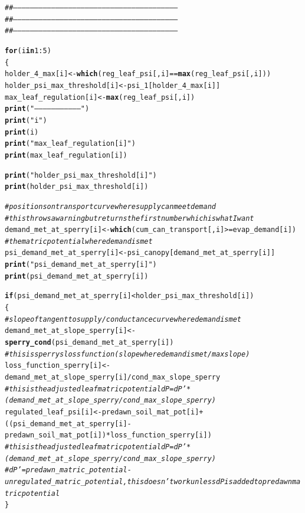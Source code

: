 \documentclass[a4paper]{article}\usepackage[]{graphicx}\usepackage[]{color}
\makeatletter
\newcommand{\hlnum}[1]{\textcolor[rgb]{0.686,0.059,0.569}{#1}}%
\newcommand{\hlstr}[1]{\textcolor[rgb]{0.192,0.494,0.8}{#1}}%
\newcommand{\hlcom}[1]{\textcolor[rgb]{0.678,0.584,0.686}{\textit{#1}}}%
\newcommand{\hlopt}[1]{\textcolor[rgb]{0,0,0}{#1}}%
\newcommand{\hlstd}[1]{\textcolor[rgb]{0.345,0.345,0.345}{#1}}%
\newcommand{\hlkwa}[1]{\textcolor[rgb]{0.161,0.373,0.58}{\textbf{#1}}}%
\newcommand{\hlkwb}[1]{\textcolor[rgb]{0.69,0.353,0.396}{#1}}%
\newcommand{\hlkwd}[1]{\textcolor[rgb]{0.737,0.353,0.396}{\textbf{#1}}}%
\newenvironment{kframe}{%
 \def\at@end@of@kframe{}%
 \ifinner\ifhmode%
  \def\at@end@of@kframe{\end{minipage}}%
  \begin{minipage}{\columnwidth}%
 \fi\fi%
 \def\FrameCommand##1{\hskip\@totalleftmargin \hskip-\fboxsep
 \colorbox{shadecolor}{##1}\hskip-\fboxsep
     \hskip-\linewidth \hskip-\@totalleftmargin \hskip\columnwidth}%
 \MakeFramed {\advance\hsize-\width
   \@totalleftmargin\z@ \linewidth\hsize
   \@setminipage}}%
 {\par\unskip\endMakeFramed%
 \at@end@of@kframe}
\newenvironment{knitrout}{}{} %
\makeatother
\begin{document}
\begin{knitrout}
\begin{kframe}
\begin{alltt}
\hlcom{##---------------------------------------------------------------------------------------------------------------------}
\hlcom{##---------------------------------------------------------------------------------------------------------------------}
\hlcom{##---------------------------------------------------------------------------------------------------------------------}

\hlkwa{for}\hlstd{(i} \hlkwa{in} \hlnum{1}\hlopt{:}\hlnum{5}\hlstd{)}
  \hlstd{\{}
    \hlstd{holder_4_max[i]} \hlkwb{<-} \hlkwd{which}\hlstd{(reg_leaf_psi[,i]}\hlopt{==}\hlkwd{max}\hlstd{(reg_leaf_psi[,i]))}
    \hlstd{holder_psi_max_threshold[i]} \hlkwb{<-} \hlstd{psi_1[holder_4_max[i]]}
    \hlstd{max_leaf_regulation[i]} \hlkwb{<-} \hlkwd{max}\hlstd{(reg_leaf_psi[,i])}
    \hlkwd{print}\hlstd{(}\hlstr{"--------------------------------"}\hlstd{)}
    \hlkwd{print}\hlstd{(}\hlstr{"i"}\hlstd{)}
    \hlkwd{print}\hlstd{(i)}
    \hlkwd{print}\hlstd{(}\hlstr{"max_leaf_regulation[i]"}\hlstd{)}
    \hlkwd{print}\hlstd{(max_leaf_regulation[i])}

    \hlkwd{print}\hlstd{(}\hlstr{"holder_psi_max_threshold[i]"}\hlstd{)}
    \hlkwd{print}\hlstd{(holder_psi_max_threshold[i])}

    \hlcom{# positions on transport curve where supply can meet demand}
    \hlcom{# this throws a warning but returns the first number which is what I want}
    \hlstd{demand_met_at_sperry[i]} \hlkwb{<-} \hlkwd{which}\hlstd{(cum_can_transport[,i]} \hlopt{>=} \hlstd{evap_demand[i])}
    \hlcom{# the matric potential where demand is met}
    \hlstd{psi_demand_met_at_sperry[i]} \hlkwb{<-} \hlstd{psi_canopy[demand_met_at_sperry[i]]}
    \hlkwd{print}\hlstd{(}\hlstr{"psi_demand_met_at_sperry[i]"}\hlstd{)}
    \hlkwd{print}\hlstd{(psi_demand_met_at_sperry[i])}

    \hlkwa{if}\hlstd{(psi_demand_met_at_sperry[i]} \hlopt{<} \hlstd{holder_psi_max_threshold[i])}
    \hlstd{\{}
    \hlcom{# slope of tangent to supply/conductance curve where demand is met}
    \hlstd{demand_met_at_slope_sperry[i]} \hlkwb{<-} \hlkwd{sperry_cond}\hlstd{(psi_demand_met_at_sperry[i])}
    \hlcom{# this is sperrys loss function (slope where demand is met / max slope)}
    \hlstd{loss_function_sperry[i]} \hlkwb{<-} \hlstd{demand_met_at_slope_sperry[i]} \hlopt{/} \hlstd{cond_max_slope_sperry}
    \hlcom{# this is the adjusted leaf matric potential dP = dP' * (demand_met_at_slope_sperry / cond_max_slope_sperry)}
    \hlstd{regulated_leaf_psi[i]} \hlkwb{<-} \hlstd{predawn_soil_mat_pot[i]} \hlopt{+} \hlstd{((psi_demand_met_at_sperry[i]} \hlopt{-} \hlstd{predawn_soil_mat_pot[i])}\hlopt{*}\hlstd{loss_function_sperry[i])}
    \hlcom{# this is the adjusted leaf matric potential dP = dP' * (demand_met_at_slope_sperry / cond_max_slope_sperry)}
    \hlcom{# dP' = predawn_matric_potential - unregulated_matric_potential, this doesn't work unless dP is added to predawn matric potential}
    \hlstd{\}}


\end{alltt}
\end{kframe}
\end{knitrout}
\end{document}
